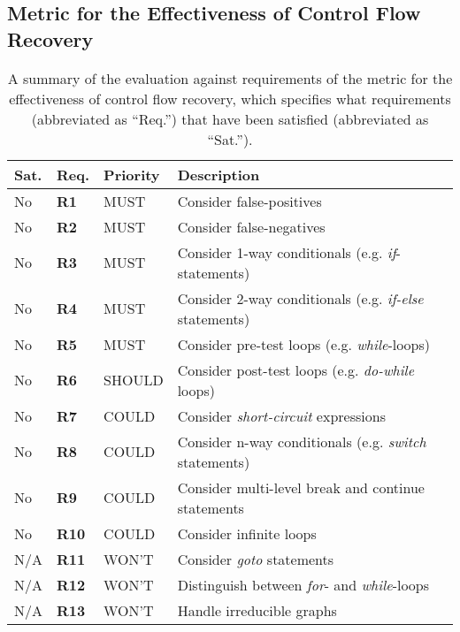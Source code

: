 
\subsection{Metric for the Effectiveness of Control Flow Recovery}



\begin{table}[htbp]
	\begin{center}
		\begin{tabular}{|l|l|l|l|}
			\hline
			Sat. & Req. & Priority & Description \\
			\hline
			\rowcolor{light_red_3}
			No & \textbf{R1} & MUST & Consider false-positives \\
			\rowcolor{light_red_3}
			No & \textbf{R2} & MUST & Consider false-negatives \\
			\rowcolor{light_red_3}
			No & \textbf{R3} & MUST & Consider 1-way conditionals (e.g. \textit{if}-statements) \\
			\rowcolor{light_red_3}
			No & \textbf{R4} & MUST & Consider 2-way conditionals (e.g. \textit{if-else} statements) \\
			\rowcolor{light_red_3}
			No & \textbf{R5} & MUST & Consider pre-test loops (e.g. \textit{while}-loops) \\
			\hline
			\rowcolor{light_red_3}
			No & \textbf{R6} & SHOULD & Consider post-test loops (e.g. \textit{do-while} loops) \\
			\hline
			\rowcolor{light_red_3}
			No & \textbf{R7} & COULD & Consider \textit{short-circuit} expressions \\
			\rowcolor{light_red_3}
			No & \textbf{R8} & COULD & Consider n-way conditionals (e.g. \textit{switch} statements) \\
			\rowcolor{light_red_3}
			No & \textbf{R9} & COULD & Consider multi-level break and continue statements \\
			\rowcolor{light_red_3}
			No & \textbf{R10} & COULD & Consider infinite loops \\
			\hline
			N/A & \textbf{R11} & WON'T & Consider \textit{goto} statements \\
			N/A & \textbf{R12} & WON'T & Distinguish between \textit{for}- and \textit{while}-loops \\
			N/A & \textbf{R13} & WON'T & Handle irreducible graphs \\
			\hline
		\end{tabular}
	\end{center}
	\caption{A summary of the evaluation against requirements of the metric for the effectiveness of control flow recovery, which specifies what requirements (abbreviated as ``Req.'') that have been satisfied (abbreviated as ``Sat.'').}
	\label{tbl:eval_summary_of_metric}
\end{table}
